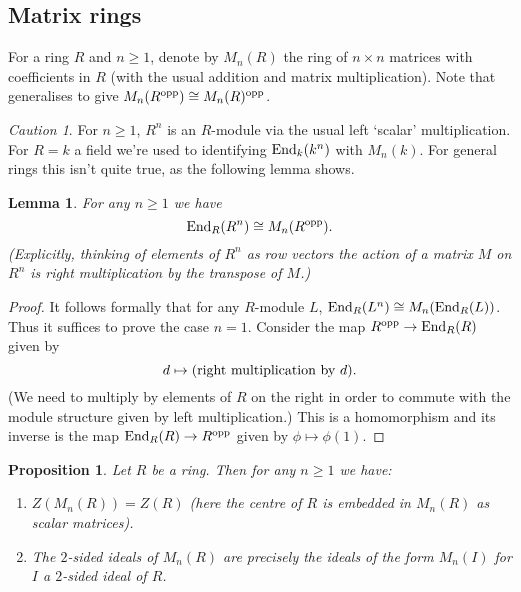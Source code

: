 \documentclass[11pt]{amsart}
\numberwithin{equation}{section}
\newtheorem{lemma}[equation]{Lemma}
\newtheorem{proposition}[equation]{Proposition}
\theoremstyle{remark}
\theoremstyle{remark}
\newtheorem{caution}[equation]{Caution}
\theoremstyle{remark}
\theoremstyle{definition}
\theoremstyle{definition}
\theoremstyle{definition}
\theoremstyle{definition}
\theoremstyle{definition}
\theoremstyle{definition}
\begin{document}
\subsection{Matrix rings}

For a ring $R$ and $n\geq 1$, denote by $M_n(R)$ the ring of $n\times n$ matrices with coefficients in $R$ (with the usual addition and matrix multiplication). Note that  generalises to give $M_n(R^\textup{opp})\cong M_n(R)^\textup{opp}$.

\begin{caution}
For $n\geq 1$, $R^n$ is an $R$-module via the usual left `scalar' multiplication. For $R=k$ a field we're used to identifying $\textup{End}_k(k^n)$ with $M_n(k)$. For general rings this isn't quite true, as the following lemma shows.
\end{caution}

\begin{lemma} \label{end matrix}
For any $n\geq 1$ we have 
\[\textup{End}_R(R^n)\cong M_n(R^\textup{opp}).\]
(Explicitly, thinking of elements of $R^n$ as row vectors the action of a matrix  $M$ on $R^n$ is right multiplication by the transpose of $M$.)
\end{lemma}

\begin{proof}
It follows formally that for any $R$-module $L$, $\textup{End}_R(L^n)\cong M_n(\textup{End}_R(L))$. Thus it suffices to prove the case $n=1$. Consider the map $R^\textup{opp}\rightarrow \textup{End}_R(R)$ given by \[d\mapsto (\textup{right multiplication by }d).\] (We need to multiply  by elements of $R$ on the right in order to commute with the module structure given by left multiplication.) This is a homomorphism and its inverse is the map $\textup{End}_R(R)\rightarrow R^\textup{opp}$ given by $\phi \mapsto \phi(1)$. 
\end{proof}

\begin{proposition} \label{basic matrix algebra prop}
Let $R$ be a ring. Then for any $n\geq 1$ we have:
\begin{enumerate}
\item $Z(M_n(R))=Z(R)$ (here the centre of $R$ is embedded in $M_n(R)$ as scalar matrices).\\
\item The $2$-sided ideals of $M_n(R)$ are precisely the ideals of the form $M_n(I)$ for $I$ a $2$-sided ideal of $R$.
\end{enumerate}
\end{proposition}
\end{document}
